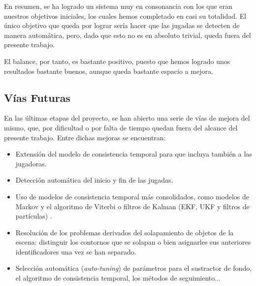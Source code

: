 En resumen, se ha logrado un sistema muy en consonancia con los que eran nuestros objetivos iniciales, los cuales hemos completado en casi su totalidad. El único objetivo que queda por lograr sería hacer que las jugadas se detecten de manera automática, pero, dado que esto no es en absoluto trivial, queda fuera del presente trabajo. 

El balance, por tanto, es bastante positivo, puesto que hemos logrado unos resultados bastante buenos, aunque queda bastante espacio a mejora.

\subsection{Vías Futuras}

En las últimas etapas del proyecto, se han abierto una serie de vías de mejora del mismo, que, por dificultad o por falta de tiempo quedan fuera del alcance del presente trabajo. Entre dichas mejoras se encuentran:
\begin{itemize}
    \item Extensión del modelo de consistencia temporal para que incluya también a las jugadoras.
    \item Detección automática del inicio y fin de las jugadas. 
    \item Uso de modelos de consistencia temporal más consolidados, como modelos de Markov y el algoritmo de Viterbi\cite{Bishop:2006:PRM:1162264} o filtros de Kalman (EKF, UKF y filtros de partículas) \cite{Thrun:2005:PR:1121596}.
    \item Resolución de los problemas derivados del solapamiento de objetos de la escena: distinguir los contornos que se solapan o bien asignarles sus anteriores identificadores una vez se han separado.
    \item Selección automática (\textit{auto-tuning}) de parámetros para el sustractor de fondo, el algoritmo de consistencia temporal, los métodos de seguimiento...
\end{itemize}